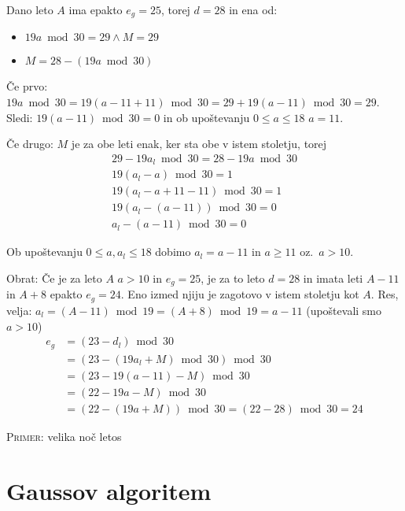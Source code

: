 \documentclass[a4paper,12pt]{article}
\begin{document}
Dano leto $A$ ima epakto $e_g = 25$, torej $d = 28$ in ena od:
\begin{itemize}
    \item $19 a \bmod 30 = 29 \land M = 29$
    \item $M = 28 - (19 a \bmod 30)$
\end{itemize}

Če prvo: $19 a \bmod 30 = 19 (a - 11 + 11) \bmod 30 = 29 + 19 (a - 11) \bmod 30 = 29$.
Sledi: $19 (a - 11) \bmod 30 = 0$ in ob upoštevanju $0 \leq a \leq 18$ $a=11$.

Če drugo: $M$ je za obe leti enak, ker sta obe v istem stoletju, torej
\begin{align*}
    29 - 19 a_l \bmod 30 = 28 - 19 a \bmod 30 \\
    19 (a_l - a) \bmod 30 = 1 \\
    19 (a_l - a + 11 - 11) \bmod 30 = 1 \\
    19 (a_l - (a - 11)) \bmod 30 = 0 \\
    a_l - (a - 11) \bmod 30 = 0
\end{align*}

Ob upoštevanju $0 \leq a, a_l \leq 18$ dobimo $a_l = a - 11$ in $a \geq 11$ oz.\ $a > 10$.

Obrat: Če je za leto $A$ $a > 10$ in $e_g = 25$, je za to leto $d = 28$ in imata leti 
$A - 11$ in $A + 8$ epakto $e_g = 24$.
Eno izmed njiju je zagotovo v istem stoletju kot $A$.
Res, velja: $a_l = (A - 11) \bmod 19 = (A + 8) \bmod 19 = a - 11$ (upoštevali smo $a > 10$)
\begin{align*}
    e_g &= (23 - d_l) \bmod 30 \\
        &= (23 - (19 a_l + M) \bmod 30) \bmod 30 \\
        &= (23 - 19 (a - 11) - M) \bmod 30 \\
        &= (22 - 19 a - M) \bmod 30 \\
        &= (22 - (19 a + M)) \bmod 30 = (22 - 28) \bmod 30 = 24
\end{align*}

\textsc{Primer:} velika noč letos

\section*{Gaussov algoritem}
\end{document}
